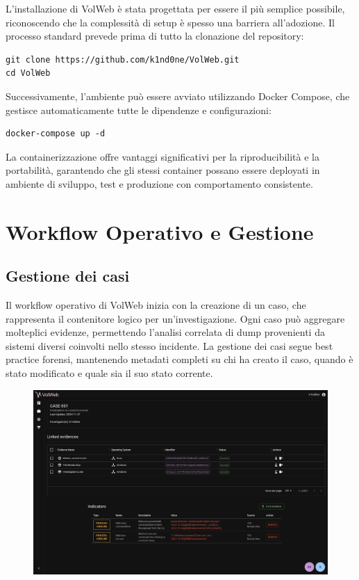 L'installazione di VolWeb è stata progettata per essere il più semplice possibile, riconoscendo che la complessità di setup è spesso una barriera all'adozione. Il processo standard prevede prima di tutto la clonazione del repository:

\begin{verbatim}
git clone https://github.com/k1nd0ne/VolWeb.git
cd VolWeb
\end{verbatim}

Successivamente, l'ambiente può essere avviato utilizzando Docker Compose, che gestisce automaticamente tutte le dipendenze e configurazioni:

\begin{verbatim}
docker-compose up -d
\end{verbatim}

La containerizzazione offre vantaggi significativi per la riproducibilità e la portabilità, garantendo che gli stessi container possano essere deployati in ambiente di sviluppo, test e produzione con comportamento consistente.

\section{Workflow Operativo e Gestione}

\subsection{Gestione dei casi}

Il workflow operativo di VolWeb inizia con la creazione di un caso, che rappresenta il contenitore logico per un'investigazione. Ogni caso può aggregare molteplici evidenze, permettendo l'analisi correlata di dump provenienti da sistemi diversi coinvolti nello stesso incidente. La gestione dei casi segue best practice forensi, mantenendo metadati completi su chi ha creato il caso, quando è stato modificato e quale sia il suo stato corrente.

\begin{figure}[H]
    \centering
    \includegraphics[width=1\linewidth]{images/volweb-original/volweb-case-management.png}
\end{figure}

